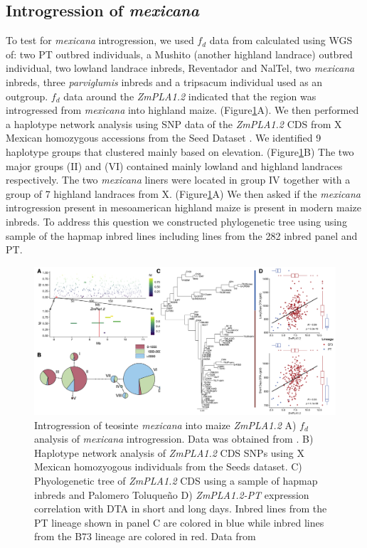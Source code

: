 \documentclass[9pt,twocolumn,twoside]{BioRxiv}
\begin{document}
\subsection{Introgression of \textit{mexicana}} 
To test for \textit{mexicana} introgression, we used \(f_d\) data from \cite{Gonzalez-Segovia2019-jy} calculated using WGS of: two PT outbred individuals, a Mushito (another highland landrace) outbred individual, two lowland landrace inbreds, Reventador and NalTel, two \textit{mexicana} inbreds, three \textit{parviglumis} inbreds and a tripsacum individual used as an outgroup. 
\(f_d\) data around the \textit{ZmPLA1.2} indicated that the region was introgressed from \textit{mexicana} into highland maize. (Figure\ref{Fig5}A).
We then performed a haplotype network analysis using SNP data of the \textit{ZmPLA1.2} CDS from X Mexican homozygous accessions from the Seed Dataset \cite{Romero_Navarro2017-cn}. 
We identified 9 haplotype groups that clustered mainly based on elevation. (Figure\ref{Fig5}B) 
The two major groups (II) and (VI) contained mainly lowland and highland landraces respectively. 
The two \textit{mexicana} liners were located in group IV together with a group of 7 highland landraces from X. (Figure\ref{Fig5}A)
We then asked if the \textit{mexicana} introgression present in mesoamerican highland maize is present in modern maize inbreds. 
To address this question we constructed phylogenetic tree using using sample of the hapmap inbred lines including lines from the 282 inbred panel and PT. 

\begin{figure}[ht]
\begin{center}
\includegraphics[width=0.8\paperwidth]{Figures/Fig_5.png}
\caption{Introgression of teosinte \textit{mexicana} into maize \textit{ZmPLA1.2}  
A) \(f_d\) analysis of \textit{mexicana} introgression. Data was obtained from \cite{Gonzalez-Segovia2019-jy}. 
B) Haplotype network analysis of \textit{ZmPLA1.2} CDS SNPs using X Mexican homozyogous individuals from the Seeds dataset.
C) Phyologenetic tree of \textit{ZmPLA1.2} CDS using a sample of hapmap inbreds and Palomero Toluqueño
D) \textit{ZmPLA1.2-PT} expression correlation with DTA in short and long days. Inbred lines from the PT lineage shown in panel C are colored in blue while inbred lines from the B73 lineage are colored in red.
Data from \cite{Kremling2018-gn}}
\label{Fig5}
\end{center}
\end{figure} 
\end{document}

